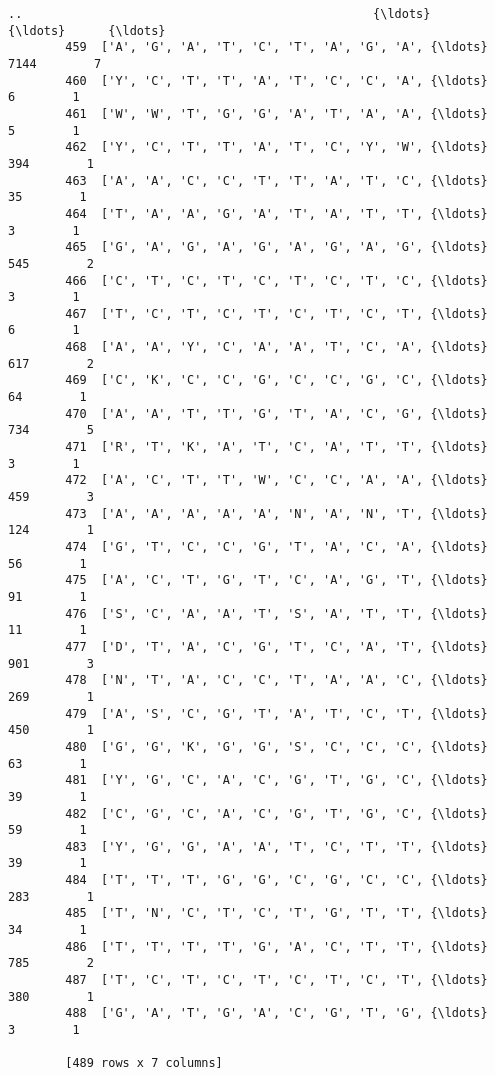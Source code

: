 \documentclass[11pt]{article}
\begin{document}
\begin{Verbatim}[commandchars=\\\{\}]
        ..                                                 {\ldots}     {\ldots}      {\ldots}  
        459  ['A', 'G', 'A', 'T', 'C', 'T', 'A', 'G', 'A', {\ldots}    7144        7  
        460  ['Y', 'C', 'T', 'T', 'A', 'T', 'C', 'C', 'A', {\ldots}       6        1  
        461  ['W', 'W', 'T', 'G', 'G', 'A', 'T', 'A', 'A', {\ldots}       5        1  
        462  ['Y', 'C', 'T', 'T', 'A', 'T', 'C', 'Y', 'W', {\ldots}     394        1  
        463  ['A', 'A', 'C', 'C', 'T', 'T', 'A', 'T', 'C', {\ldots}      35        1  
        464  ['T', 'A', 'A', 'G', 'A', 'T', 'A', 'T', 'T', {\ldots}       3        1  
        465  ['G', 'A', 'G', 'A', 'G', 'A', 'G', 'A', 'G', {\ldots}     545        2  
        466  ['C', 'T', 'C', 'T', 'C', 'T', 'C', 'T', 'C', {\ldots}       3        1  
        467  ['T', 'C', 'T', 'C', 'T', 'C', 'T', 'C', 'T', {\ldots}       6        1  
        468  ['A', 'A', 'Y', 'C', 'A', 'A', 'T', 'C', 'A', {\ldots}     617        2  
        469  ['C', 'K', 'C', 'C', 'G', 'C', 'C', 'G', 'C', {\ldots}      64        1  
        470  ['A', 'A', 'T', 'T', 'G', 'T', 'A', 'C', 'G', {\ldots}     734        5  
        471  ['R', 'T', 'K', 'A', 'T', 'C', 'A', 'T', 'T', {\ldots}       3        1  
        472  ['A', 'C', 'T', 'T', 'W', 'C', 'C', 'A', 'A', {\ldots}     459        3  
        473  ['A', 'A', 'A', 'A', 'A', 'N', 'A', 'N', 'T', {\ldots}     124        1  
        474  ['G', 'T', 'C', 'C', 'G', 'T', 'A', 'C', 'A', {\ldots}      56        1  
        475  ['A', 'C', 'T', 'G', 'T', 'C', 'A', 'G', 'T', {\ldots}      91        1  
        476  ['S', 'C', 'A', 'A', 'T', 'S', 'A', 'T', 'T', {\ldots}      11        1  
        477  ['D', 'T', 'A', 'C', 'G', 'T', 'C', 'A', 'T', {\ldots}     901        3  
        478  ['N', 'T', 'A', 'C', 'C', 'T', 'A', 'A', 'C', {\ldots}     269        1  
        479  ['A', 'S', 'C', 'G', 'T', 'A', 'T', 'C', 'T', {\ldots}     450        1  
        480  ['G', 'G', 'K', 'G', 'G', 'S', 'C', 'C', 'C', {\ldots}      63        1  
        481  ['Y', 'G', 'C', 'A', 'C', 'G', 'T', 'G', 'C', {\ldots}      39        1  
        482  ['C', 'G', 'C', 'A', 'C', 'G', 'T', 'G', 'C', {\ldots}      59        1  
        483  ['Y', 'G', 'G', 'A', 'A', 'T', 'C', 'T', 'T', {\ldots}      39        1  
        484  ['T', 'T', 'T', 'G', 'G', 'C', 'G', 'C', 'C', {\ldots}     283        1  
        485  ['T', 'N', 'C', 'T', 'C', 'T', 'G', 'T', 'T', {\ldots}      34        1  
        486  ['T', 'T', 'T', 'T', 'G', 'A', 'C', 'T', 'T', {\ldots}     785        2  
        487  ['T', 'C', 'T', 'C', 'T', 'C', 'T', 'C', 'T', {\ldots}     380        1  
        488  ['G', 'A', 'T', 'G', 'A', 'C', 'G', 'T', 'G', {\ldots}       3        1  
        
        [489 rows x 7 columns]
\end{Verbatim}
            
\end{document}
